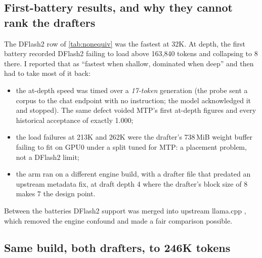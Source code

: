 \subsection{First-battery results, and why they cannot rank the drafters}
The DFlash2 row of \cref{tab:nonequiv} was the fastest at 32K. At depth, the first battery recorded
DFlash2 failing to load above 163{,}840 tokens and collapsing to 8\tps{} there. I reported that as
``fastest when shallow, dominated when deep'' and then had to take most of it back:
\begin{itemize}
\item the at-depth speed was timed over a \emph{17-token} generation (the probe sent a corpus to the
chat endpoint with no instruction; the model acknowledged it and stopped). The same defect voided
MTP's first at-depth figures and every historical acceptance of exactly 1.000;
\item the load failures at 213K and 262K were the drafter's 738\,MiB weight buffer failing to fit on
GPU0 under a split tuned for MTP: a placement problem, not a DFlash2 limit;
\item the arm ran on a different engine build, with a drafter file that predated an upstream
metadata fix, at draft depth 4 where the drafter's block size of 8 makes 7 the design point.
\end{itemize}
Between the batteries DFlash2 support was merged into upstream llama.cpp
\citep{llamacpp_pr27342_dflash2}, which removed the engine confound and made a fair comparison
possible.

\subsection{Same build, both drafters, to 246K tokens}\label{sec:s15speed}

